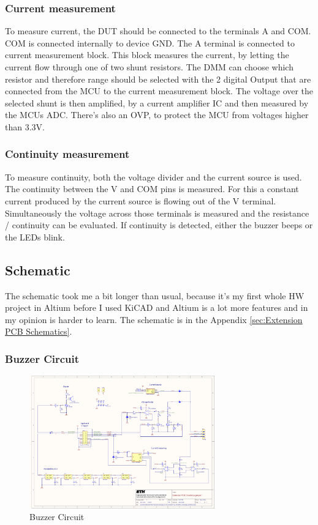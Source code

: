 \subsubsection{Current measurement}
To measure current, the DUT should be connected to the terminals A and COM. COM is connected internally to device GND. The A terminal is connected to current measurement block. This block measures the current, by letting the current flow through one of two shunt resistors. The DMM can choose which resistor and therefore range should be selected with the 2 digital Output that are connected from the MCU to the current measurement block. The voltage over the selected shunt is then amplified, by a current amplifier IC and then measured by the MCUs ADC. There's also an OVP, to protect the MCU from voltages higher than 3.3V. \cite{DMM_Video_ElectroNoobs}

\subsubsection{Continuity measurement}
To measure continuity, both the voltage divider and the current source is used. The continuity between the V and COM pins is measured. For this a constant current produced by the current source is flowing out of the V terminal. Simultaneously the voltage across those terminals is measured and the resistance / continuity can be evaluated. If continuity is detected, either the buzzer beeps or the LEDs blink. \cite{DMM_Video_ElectroNoobs}



\subsection{Schematic}
The schematic took me a bit longer than usual, because it's my first whole HW project in Altium before I used KiCAD and Altium is a lot more features and in my opinion is harder to learn. The schematic is in the Appendix \ref{sec:Extension PCB Schematics}.

\subsubsection{Buzzer Circuit}

\begin{figure}[H]
	\centering
	\includegraphics[width=8cm, trim={3.4cm 19cm 28.5cm 2cm}, clip]{Resources/Pictures/Schematic_PCB_EXTENSION_CircuitVoyager_pre1.pdf}
	\caption{Buzzer Circuit}
	\label{fig:Buzzer Circuit}
\end{figure}

